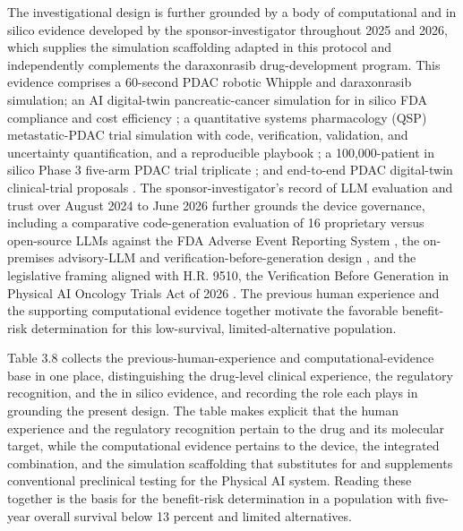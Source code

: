 The investigational design is further grounded by a body of computational and
in silico evidence developed by the sponsor-investigator throughout 2025 and 2026,
which supplies the simulation scaffolding adapted in this protocol and independently
complements the daraxonrasib drug-development program. This evidence comprises a
60-second PDAC robotic Whipple and daraxonrasib simulation; an AI digital-twin
pancreatic-cancer simulation for in silico FDA compliance and cost efficiency
\cite{fdadigtwinpc}; a quantitative systems pharmacology (QSP) metastatic-PDAC trial
simulation with code, verification, validation, and uncertainty quantification, and
a reproducible playbook \cite{qspmetpancre}; a 100,000-patient in silico Phase 3
five-arm PDAC trial triplicate \cite{chatgpt100kp}; and end-to-end PDAC digital-twin
clinical-trial proposals \cite{pdacdigtwinp}. The sponsor-investigator's record of
LLM evaluation and trust over August 2024 to June 2026 further grounds the device
governance, including a comparative code-generation evaluation of 16 proprietary
versus open-source LLMs against the FDA Adverse Event Reporting System
\cite{llmcomp16fda}, the on-premises advisory-LLM and verification-before-generation
design \cite{clintrustpai}, and the legislative framing aligned with H.R. 9510, the
Verification Before Generation in Physical AI Oncology Trials Act of 2026
\cite{congress9510}. The previous human experience and the supporting computational
evidence together motivate the favorable benefit-risk determination for this
low-survival, limited-alternative population.

Table 3.8 collects the previous-human-experience and computational-evidence base in
one place, distinguishing the drug-level clinical experience, the regulatory
recognition, and the in silico evidence, and recording the role each plays in
grounding the present design. The table makes explicit that the human experience and
the regulatory recognition pertain to the drug and its molecular target, while the
computational evidence pertains to the device, the integrated combination, and the
simulation scaffolding that substitutes for and supplements conventional preclinical
testing for the Physical AI system. Reading these together is the basis for the
benefit-risk determination in a population with five-year overall survival below 13
percent and limited alternatives.

